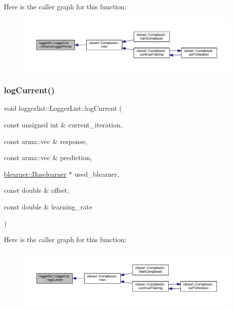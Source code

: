 Here is the caller graph for this function\+:\nopagebreak
\begin{figure}[H]
\begin{center}
\leavevmode
\includegraphics[width=350pt]{classloggerlist_1_1_logger_list_a07c6748f551b89aa0b1eede48b120728_icgraph}
\end{center}
\end{figure}
\mbox{\label{classloggerlist_1_1_logger_list_a5fc042fd489ebd88c09c469763ee9faa}} 
\subsubsection{\texorpdfstring{log\+Current()}{logCurrent()}}
{\footnotesize\ttfamily void loggerlist\+::\+Logger\+List\+::log\+Current (\begin{DoxyParamCaption}\item[{const unsigned int \&}]{current\+\_\+iteration,  }\item[{const arma\+::vec \&}]{response,  }\item[{const arma\+::vec \&}]{prediction,  }\item[{\hyperlink{classblearner_1_1_baselearner}{blearner\+::\+Baselearner} $\ast$}]{used\+\_\+blearner,  }\item[{const double \&}]{offset,  }\item[{const double \&}]{learning\+\_\+rate }\end{DoxyParamCaption})}

Here is the caller graph for this function\+:\nopagebreak
\begin{figure}[H]
\begin{center}
\leavevmode
\includegraphics[width=350pt]{classloggerlist_1_1_logger_list_a5fc042fd489ebd88c09c469763ee9faa_icgraph}
\end{center}
\end{figure}
\mbox{\label{classloggerlist_1_1_logger_list_a5ec429c3927009e3d87544a0f084e678}} 
